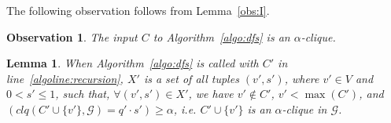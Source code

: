 \documentclass[11pt,letterpaper]{article}
\newtheorem{lemma}{Lemma}
\newtheorem{observation}{Observation}
\newcommand{\ugraph}{\mathcal{G}}
\newcommand{\cliqueprob}{clq}
\begin{document}
The following observation follows from Lemma~\ref{obs:I}.
\begin{observation}
\label{obs:cliqueprob}
The input $C$ to Algorithm~\ref{algo:dfs} is an $\alpha$-clique.
\end{observation}


\begin{lemma}
\label{obs:X}
When Algorithm~\ref{algo:dfs} is called with $C'$ in line~\ref{algoline:recursion}, 
$X'$ is a set of all tuples $(v',s')$, where $v' \in V$ and $0 < s' \le 1$,
such that, $\forall (v',s') \in X'$, we have $v' \not \in C'$, $v' < \max(C')$, 
and $(\cliqueprob(C' \cup \{ v' \},\ugraph) = q' \cdot s') \ge \alpha$,
i.e. $C' \cup \{ v' \}$ is an $\alpha$-clique in $\ugraph$.
\end{lemma}
\end{document}
